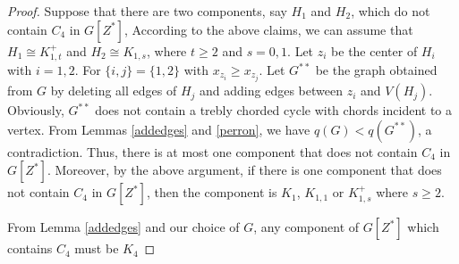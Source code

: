 \documentclass[10pt,a4paper]{amsart}
\begin{document}
\begin{proof}
Suppose that there are two components, say $H_1$ and $H_2$,  which do not contain $C_4$ in $G[Z^*]$,
According to the above claims, we can assume that $H_1\cong K_{1,t}^+$ and $H_2\cong K_{1,s}$, where $t\ge 2$ and $s=0,1$. Let $z_i$ be the center of $H_i$ with $i=1,2$.  For $\{i,j\}=\{1,2\}$ with $x_{z_i}\ge x_{z_j}$.
Let $G^{**}$ be the graph obtained from $G$ by deleting all edges of $H_j$ and adding edges between $z_i$ and $V(H_j)$.
Obviously, $G^{**}$ does not contain a trebly chorded cycle with chords incident to a vertex.
From Lemmas \ref{addedges} and \ref{perron}, we have $q(G)<q(G^{**})$, a contradiction.
Thus,  there is at most one component that does not contain $C_4$ in $G[Z^*]$. Moreover,
by the above argument, if there is  one component that does not contain $C_4$ in $G[Z^*]$, then the component is $K_1$, $K_{1,1}$ or $K_{1,s}^+$ where $s\ge 2$.

From Lemma \ref{addedges} and our choice of $G$,  any  component of $G[Z^*]$ which contains $C_4$ must be  $K_4$
%
%
\end{proof}
\end{document}
